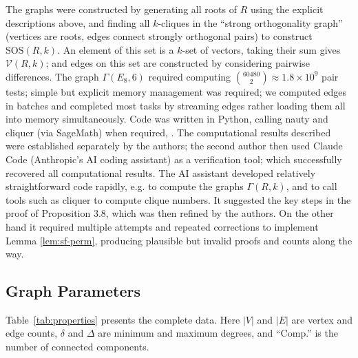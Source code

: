 \documentclass[11pt]{article}
\begin{document}
The graphs were constructed by generating all roots of $R$ using the explicit descriptions above, and finding all $k$-cliques in the ``strong orthogonality graph'' (vertices are roots, edges connect strongly orthogonal pairs) to construct $\mathrm{SOS}(R,k)$. An element of this set is a $k$-set of vectors, taking their sum gives $\mathcal{V}(R,k)$; and edges on this set are constructed by considering pairwise differences. The graph $\Gamma(E_8, 6)$ required computing $\binom{60480}{2} \approx 1.8 \times 10^9$ pair tests; simple but explicit memory management was required; we computed edges in batches and completed most tasks by streaming edges rather loading them all into memory simultaneously. Code was written in Python, calling nauty and cliquer (via SageMath) when required, \cite{nauty, cliquer}. The computational results described were established separately by the authors; the second author then used Claude Code (Anthropic's AI coding assistant) as a verification tool; which successfully recovered all computational results. The AI assistant developed relatively straightforward code rapidly, e.g. to compute the graphs $\Gamma(R, k)$, and to call tools such as cliquer to compute clique numbers. It suggested the key steps in the proof of Proposition 3.8, which was then refined by the authors. On the other hand it required multiple attempts and repeated corrections to implement Lemma \ref{lem:sf-perm}, producing plausible but invalid proofs and counts along the way. 

\subsection{Graph Parameters}


Table~\ref{tab:properties} presents the complete data. Here $|V|$ and $|E|$ are vertex and edge counts, $\delta$ and $\Delta$ are minimum and maximum degrees, and ``Comp.'' is the number of connected components.
\end{document}

